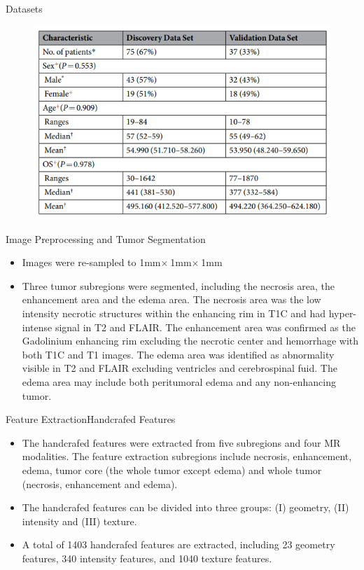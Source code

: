 \documentclass[
]{beamer}
\begin{document}
\begin{frame}{Datasets}
\begin{figure}
	\includegraphics[scale=0.5]{data2}
\end{figure}
\end{frame}

\begin{frame}{Image Preprocessing and Tumor Segmentation}
\begin{itemize}
	\item  Images were re-sampled to 1mm$\times$ 1mm$\times$ 1mm
	\item Three tumor subregions were segmented, including the necrosis area, the enhancement area and the
	edema area.  The necrosis area was the low intensity necrotic structures within the enhancing rim in T1C and had
	hyper-intense signal in T2 and FLAIR. The enhancement area was confirmed as the Gadolinium enhancing rim
	excluding the necrotic center and hemorrhage with both T1C and T1 images. The edema area was identified as
	abnormality visible in T2 and FLAIR excluding ventricles and cerebrospinal fuid. The edema area may include
	both peritumoral edema and any non-enhancing tumor.
\end{itemize}
\end{frame}

\begin{frame}{Feature Extraction}{Handcrafed Features}
\begin{itemize}
	\item The handcrafed features were extracted from five subregions
	and four MR modalities. The feature extraction subregions include necrosis, enhancement, edema, tumor core
	(the whole tumor except edema) and whole tumor (necrosis, enhancement and edema). 
	\item The handcrafed features
	can be divided into three groups: (I) geometry, (II) intensity and (III) texture. 
	\item A total of
	1403 handcrafed features are extracted, including 23 geometry features, 340 intensity features, and 1040 texture
	features. 
\end{itemize}
\end{frame}
\end{document}
